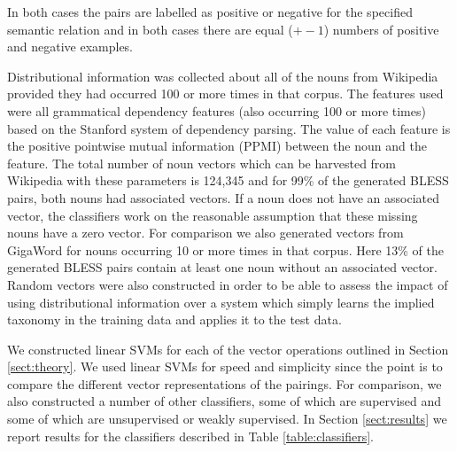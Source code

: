 \documentclass[11pt]{article}
\begin{document}
In both cases the pairs are labelled as positive or negative for the specified semantic relation and in both cases there are equal ($+-1$) numbers of positive and negative examples.

Distributional information was collected about all of the nouns from Wikipedia provided they had occurred 100 or more times in that corpus.  The features used were all grammatical dependency features (also occurring 100 or more times) based on the Stanford system of dependency parsing.  The value of each feature is the positive pointwise mutual information (PPMI) between the noun and the feature. The total number of noun vectors which can be harvested from Wikipedia with these parameters is 124,345 and for 99\% of the generated BLESS pairs, both nouns had associated vectors.   If a noun does not have an associated vector, the classifiers work on the reasonable assumption that these missing nouns have a zero vector.   For comparison we also generated vectors from GigaWord for nouns occurring 10 or more times in that corpus.  Here 13\% of the generated BLESS pairs contain at least one noun without an associated vector.  Random vectors were also constructed in order to be able to assess the impact of using distributional information over a system which simply learns the implied taxonomy in the training data and applies it to the test data.

We constructed linear SVMs for each of the vector operations outlined in Section \ref{sect:theory}.  We used linear SVMs for speed and simplicity since the point is to compare the different vector representations of the pairings.  For comparison, we also constructed a number of other classifiers, some of which are supervised and some of which are unsupervised or weakly supervised.  In Section \ref{sect:results} we report results for the classifiers described in Table \ref{table:classifiers}.
\end{document}
